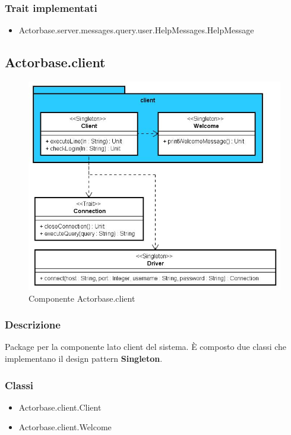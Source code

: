 \documentclass[a4paper]{article}
\begin{document}
			\subsubsection{Trait implementati}
				\begin{itemize}
					\item Actorbase.server.messages.query.user.HelpMessages.HelpMessage
				\end{itemize}
			
		\subsection{Actorbase.client}
		
			\begin{figure}[H]
				\centering
				\includegraphics[width=\textwidth]{ST/Client/clientLevel.jpg}
				\caption{Componente Actorbase.client}
			\end{figure}
			\subsubsection{Descrizione}
				Package per la componente lato client del sistema. 
				È composto due classi che implementano il design pattern \textbf{Singleton}.
				
			\subsubsection{Classi}
				\begin{itemize}
					\item Actorbase.client.Client
					\item Actorbase.client.Welcome
				\end{itemize}
				
\end{document}

